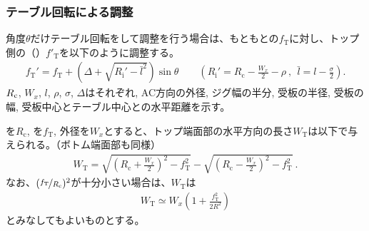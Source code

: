 \subsubsection{テーブル回転による調整}
角度$\theta$だけテーブル回転をして調整を行う場合は、もともとの\TopAlocationLength$f_\mathrm T$に対し、トップ側の\AlocationLength（\TopReAlocationLength）$f'_\mathrm T$を以下のように調整する。
\begin{align*}
  f_\mathrm T'
  = f_\mathrm T+\left(\Delta+\sqrt{R_\mathrm i'-\bar l^2}\right)\sin\theta\qquad
    \left(R_\mathrm i' = R_\mathrm c-\frac{W_x}2-\rho~,~~\bar l = l-\frac\sigma2\right).
\end{align*}
$R_\textrm c$, $W_x$, $l$, $\rho$, $\sigma$, $\Delta$はそれぞれ\CenterCurvatureRadius, AC方向の外径, ジグ幅の半分, 受板の半径, 受板の幅, 受板中心とテーブル中心との水平距離を示す。



\clearpage
\nameCenterCurvatureRadius を$R_\mathrm c$, \TopAlocationLength を$f_\mathrm T$, 外径を$W_x$とすると、トップ端面部の水平方向の長さ$W_\mathrm T$は以下で与えられる。（ボトム端面部も同様）
\begin{align*}
  W_\mathrm T
  = \sqrt{\left(R_\mathrm c+\frac{W_x}2\right)^2-f_\mathrm T^2}
    -\sqrt{\left(R_\mathrm c-\frac{W_x}2\right)^2-f_\mathrm T^2}\ .
\end{align*}
なお、$(\nicefrac{f_\mathrm T}{R_\mathrm c})^2$が十分小さい場合は、$W_\mathrm T$は
\begin{align*}
  W_\mathrm T \simeq W_x\left(1+\frac{f_\mathrm T^2}{2R^2}\right)
\end{align*}
とみなしてもよいものとする。




